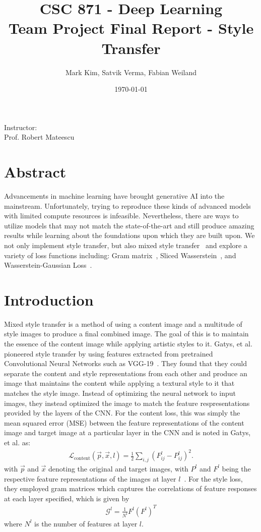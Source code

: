 \documentclass[12pt]{article}
\title{\textbf{CSC 871 - Deep Learning}\\\Large Team Project Final Report - Style Transfer}
\author{\large Mark Kim, Satvik Verma, Fabian Weiland}
\date{\today}
\begin{document}
\maketitle
\vspace{5mm}
\begin{center}
    Instructor:\\
    Prof. Robert Mateescu
\end{center}
\newpage
\tableofcontents
\newpage
\section{Abstract}
Advancements in machine learning have brought generative AI into the mainstream.
Unfortunately, trying to reproduce these kinds of advanced models with limited
compute resources is infeasible.  Nevertheless, there are ways to utilize models
that may not match the state-of-the-art and still produce amazing results while
learning about the foundations upon which they are built upon.  We not only
implement style transfer, but also mixed style transfer~\cite{froehling} and
explore a variety of loss functions including: Gram matrix~\cite{gatys},
Sliced Wasserstein~\cite{heitz}, and Wasserstein-Gaussian Loss~\cite{Marron}.

\section{Introduction}
Mixed style transfer is a method of using a content image and a multitude of
style images to produce a final combined image. The goal of this is to
maintain the essence of the content image while applying artistic styles to it.
Gatys, et al. pioneered style transfer by using features extracted from
pretrained Convolutional Neural Networks such as VGG-19~\cite{gatys}.  They found that they
could separate the content and style representations from each other and produce
an image that maintains the content while applying a textural style to it that
matches the style image.  Instead of optimizing the neural network to input
images, they instead optimized the image to match the feature respresentations
provided by the layers of the CNN.  For the content loss, this was simply the
mean squared error (MSE) between the feature representations of the content
image and target image at a particular layer in the CNN and is noted in Gatys,
et al. as:
\begin{align}
    \mathcal{L}_{\mathrm{content}}\left(\vec{p}, \vec{x}, l\right) = \frac{1}{2} 
    \sum_{i,j} \left(F_{ij}^l - P_{ij}^l \right)^2.
\end{align}
with $\vec{p}$ and $\vec{x}$ denoting the original and target images, with $P^l$
and $F^l$ being the respective feature representations of the images at layer
$l$~\cite{gatys}.
For the style loss, they employed gram matrices which captures the correlations
of feature responses at each layer specified, which is given by
\begin{align}
    \mathcal{G}^l = \frac{1}{N^l}F^l\left(F^l\right)^T
\end{align}
where $N^l$ is the number of features at layer $l$.
\end{document}
